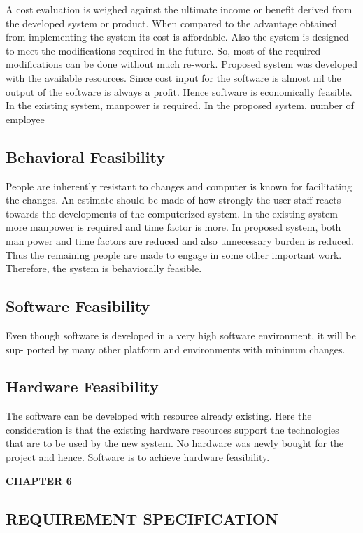 \documentclass[12pt]{article}
\begin{document}
A cost evaluation is weighed against the ultimate income or benefit derived from
the developed system or product. When compared to the advantage obtained from
implementing the system its cost is affordable. Also the system is designed to meet the
modifications required in the future. So, most of the required modifications can be done
without much re-work. Proposed system was developed with the available resources.
Since cost input for the software is almost nil the output of the software is always a
profit. Hence software is economically feasible. In the existing system, manpower is
required. In the proposed system, number of employee



\subsection{Behavioral Feasibility }
People are inherently resistant to changes and computer is known for facilitating the
changes. An estimate should be made of how strongly the user staff reacts towards the
developments of the computerized system. In the existing system more manpower is
required and time factor is more. In proposed system, both man power and time factors
are reduced and also unnecessary burden is reduced. Thus the remaining people are
made to engage in some other important work. Therefore, the system is behaviorally
feasible.
\subsection{ Software Feasibility}

Even though software is developed in a very high software environment, it will be
sup- ported by many other platform and environments with minimum changes.

\subsection{ Hardware Feasibility}

The software can be developed with resource already existing. Here the consideration
is that the existing hardware resources support the technologies that are to be used by
the new system. No hardware was newly bought for the project and hence. Software
is to achieve hardware feasibility.

\newpage
\begin{flushleft}\textbf{CHAPTER 6} \end{flushleft}
\begin{flushleft}\section{REQUIREMENT SPECIFICATION} \end{flushleft}
\vspace*{10px}
\end{document}
